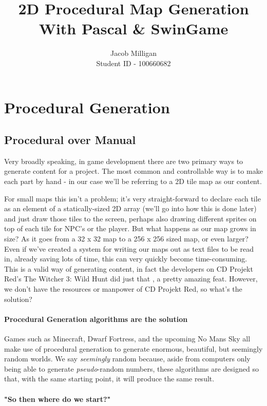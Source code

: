 \documentclass{article}
\title{2D Procedural Map Generation \\ \large With Pascal \& SwinGame}
\author{Jacob Milligan \\ \small Student ID - 100660682}
\date{}
\begin{document}
\maketitle
	
	
\section{Procedural Generation}

\subsection{Procedural over Manual}


Very broadly speaking, in game development there are two primary ways to generate content for a project. The most common and controllable way is to make each part by hand - in our case we'll be referring to a 2D tile map as our content.
		
For small maps this isn't a problem; it's very straight-forward to declare each tile as an element of a statically-sized 2D array (we'll go into how this is done later) and just draw those tiles 	to the screen, perhaps also drawing different sprites on top of each tile for NPC's or the player. But what happens as our map grows in size? As it goes from a 32 x 32 map to a 256 x 256 sized map, or even larger? Even if we've created a system for writing our maps out as text files to be read in, already saving lots of time, this can very quickly become time-consuming. This is a valid way of generating content, in fact the developers on CD Projekt Red's The Witcher 3: Wild Hunt did just that \parencite{witcher}, a pretty amazing feat. However, we don't have the resources or manpower of CD Projekt Red, so what's the solution?
		
\paragraph{Procedural Generation algorithms are the solution}\mbox{}
		
Games such as Minecraft, Dwarf Fortress, and the upcoming No Mans Sky all make use of procedural generation to generate enormous, beautiful, but seemingly random worlds. We say \emph{seemingly} random because, aside from computers only being able to generate \emph{pseudo}-random numbers, these algorithms are designed so that, with the same starting point, it will produce the same result.
		
\paragraph{"So then where do we start?"}
		
\end{document}
